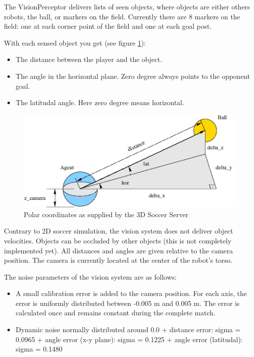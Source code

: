 The VisionPerceptor delivers lists of seen objects, where objects are
either others robots, the ball, or markers on the field. Currently
there are 8 markers on the field: one at each corner point of the
field and one at each goal post.

With each sensed object you get (see figure \ref{fig:polarcoordinates}):

\begin{itemize}
  \item The distance between the player and the object.
  \item The angle in the horizontal plane. Zero degree always points to the
opponent goal.
  \item The latitudal angle. Here zero degree means horizontal. 
\end{itemize}

\begin{figure}[htp]
  \centering
  \includegraphics[scale=0.4]{fig/polar_conversion}
  \caption{Polar coordinates as supplied by the 3D Soccer Server \cite{Vorst06}}
  \label{fig:polarcoordinates}
\end{figure}

Contrary to 2D soccer simulation, the vision system does not deliver
object velocities. Objects can be occluded by other objects (this is
not completely implemented yet). All distances and angles are given
relative to the camera position. The camera is currently located at
the center of the robot's torso.


The noise parameters of the vision system are as follows:
\begin{itemize}
  \item A small calibration error is added to the camera position. For each
  axis, the error is uniformly distributed between -0.005 m and 0.005 m. The
  error is calculated once and remains constant during the complete match.
  \item Dynamic noise normally distributed around 0.0
  + distance error:  sigma = 0.0965
  + angle error (x-y plane): sigma = 0.1225
  + angle error (latitudal): sigma = 0.1480
\end{itemize}

